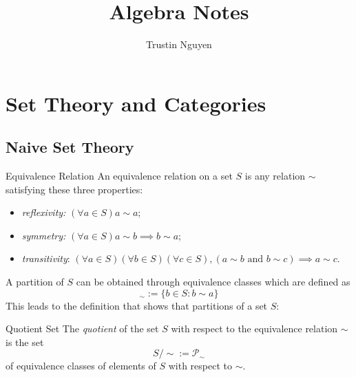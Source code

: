 \documentclass{report}
\title{Algebra Notes}
\author{Trustin Nguyen}
\begin{document}

\begin{titlepage}
    \maketitle
\end{titlepage}
\tableofcontents
\restoregeometry
\reversemarginpar

\chapter{Set Theory and Categories}

\begin{topic}
    \section{Naive Set Theory}
\end{topic}

\begin{definition}[\label{def:1.1.1}]{Equivalence Relation}
    An equivalence relation on a set $S$ is any relation $\sim $ satisfying these three properties:
    \begin{itemize}
        \item \textit{reflexivity:} $(\forall a \in S) a \sim a$;

        \item \textit{symmetry:} $(\forall a \in S) a \sim b \implies b \sim a$;

        \item \textit{transitivity}: $(\forall a \in S)(\forall b \in S)(\forall c \in S), (a \sim b \text{ and } b \sim c) \implies a \sim c$.
    \end{itemize}
\end{definition}

A partition of $S$ can be obtained through equivalence classes which are defined as
    \begin{equation*}
        [a]_{\sim } := \{b \in S : b \sim a\}
    \end{equation*}
This leads to the definition that shows that partitions of a set $S$:

\begin{definition}[\label{def:1.1.2}]{Quotient Set}
    The \textit{quotient} of the set $S$ with respect to the equivalence relation $\sim $ is the set
    \begin{equation*}
        S/\sim := \mathcal{P}_{\sim }
    \end{equation*}
    of equivalence classes of elements of $S$ with respect to $\sim $.
\end{definition}
\end{document}
